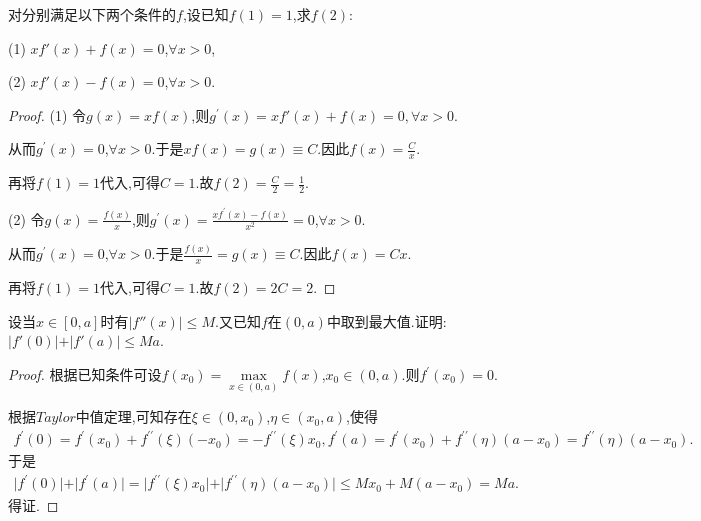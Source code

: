 \documentclass[lang=cn,newtx,10pt,scheme=chinese]{../Template/elegantbook}
\begin{document}
\begin{exercise}
    对分别满足以下两个条件的\(f\),设已知\(f(1)=1\),求\(f(2)\):

    (1) \(xf'(x)+f(x)=0\),\(\forall x > 0\),

    (2) \(xf'(x)-f(x)=0\),\(\forall x > 0\).
\end{exercise}
\begin{proof}
    (1) 令\(g(x) = xf(x)\),则\(g^{\prime}(x) =xf\prime\left( x \right) +f\left( x \right) =0,\forall x>0\).

从而\(g^{\prime}(x) = 0\),\(\forall x > 0\).于是\(xf(x) = g(x) \equiv C\).因此\(f(x) = \frac{C}{x}\).

再将\(f(1) = 1\)代入,可得\(C = 1\).故\(f(2) = \frac{C}{2} = \frac{1}{2}\).

(2) 令\(g(x) = \frac{f(x)}{x}\),则\(g^{\prime}(x) = \frac{xf^{\prime}(x) - f(x)}{x^2} = 0\),\(\forall x > 0\).

从而\(g^{\prime}(x) = 0\),\(\forall x > 0\).于是\(\frac{f(x)}{x} = g(x) \equiv C\).因此\(f(x) = Cx\).

再将\(f(1) = 1\)代入,可得\(C = 1\).故\(f(2) = 2C = 2\). 
\end{proof}

\begin{exercise}
    设当\(x\in[0,a]\)时有\(\vert f''(x)\vert\leqslant M\).又已知\(f\)在\((0,a)\)中取到最大值.证明:
    \(\vert f'(0)\vert+\vert f'(a)\vert\leqslant Ma\).
\end{exercise}
\begin{proof}
    根据已知条件可设\(f(x_0)=\underset{x\in (0,a)}{\max}f(x)\),\(x_0\in (0,a)\).则\(f^{\prime}(x_0)=0\).

根据\(Taylor\)中值定理,可知存在\(\xi \in (0,x_0)\),\(\eta \in (x_0,a)\),使得
\begin{align*}
    f^{\prime}(0)=f^{\prime}(x_0)+f^{\prime\prime}(\xi)(-x_0)=-f^{\prime\prime}(\xi)x_0,
f^{\prime}(a)=f^{\prime}(x_0)+f^{\prime\prime}(\eta)(a - x_0)=f^{\prime\prime}(\eta)(a - x_0).
\end{align*}
于是
\begin{align*}
    \vert f^{\prime}(0)\vert+\vert f^{\prime}(a)\vert=\vert f^{\prime\prime}(\xi)x_0\vert+\vert f^{\prime\prime}(\eta)(a - x_0)\vert\leqslant Mx_0 + M(a - x_0)=Ma.
\end{align*}
得证.
\end{proof}
\end{document}
